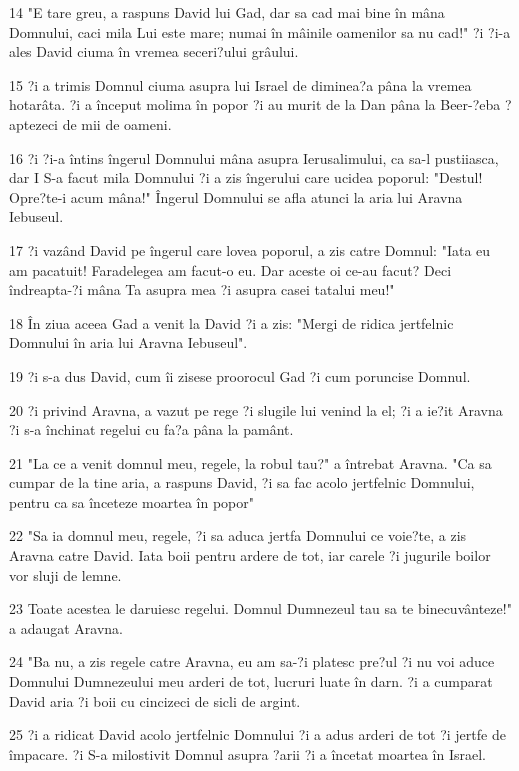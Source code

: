 \par 14 "E tare greu, a raspuns David lui Gad, dar sa cad mai bine în mâna Domnului, caci mila Lui este mare; numai în mâinile oamenilor sa nu cad!" ?i ?i-a ales David ciuma în vremea seceri?ului grâului.
\par 15 ?i a trimis Domnul ciuma asupra lui Israel de diminea?a pâna la vremea hotarâta. ?i a început molima în popor ?i au murit de la Dan pâna la Beer-?eba ?aptezeci de mii de oameni.
\par 16 ?i ?i-a întins îngerul Domnului mâna asupra Ierusalimului, ca sa-l pustiiasca, dar I S-a facut mila Domnului ?i a zis îngerului care ucidea poporul: "Destul! Opre?te-i acum mâna!" Îngerul Domnului se afla atunci la aria lui Aravna Iebuseul.
\par 17 ?i vazând David pe îngerul care lovea poporul, a zis catre Domnul: "Iata eu am pacatuit! Faradelegea am facut-o eu. Dar aceste oi ce-au facut? Deci îndreapta-?i mâna Ta asupra mea ?i asupra casei tatalui meu!"
\par 18 În ziua aceea Gad a venit la David ?i a zis: "Mergi de ridica jertfelnic Domnului în aria lui Aravna Iebuseul".
\par 19 ?i s-a dus David, cum îi zisese proorocul Gad ?i cum poruncise Domnul.
\par 20 ?i privind Aravna, a vazut pe rege ?i slugile lui venind la el; ?i a ie?it Aravna ?i s-a închinat regelui cu fa?a pâna la pamânt.
\par 21 "La ce a venit domnul meu, regele, la robul tau?" a întrebat Aravna. "Ca sa cumpar de la tine aria, a raspuns David, ?i sa fac acolo jertfelnic Domnului, pentru ca sa înceteze moartea în popor"
\par 22 "Sa ia domnul meu, regele, ?i sa aduca jertfa Domnului ce voie?te, a zis Aravna catre David. Iata boii pentru ardere de tot, iar carele ?i jugurile boilor vor sluji de lemne.
\par 23 Toate acestea le daruiesc regelui. Domnul Dumnezeul tau sa te binecuvânteze!" a adaugat Aravna.
\par 24 "Ba nu, a zis regele catre Aravna, eu am sa-?i platesc pre?ul ?i nu voi aduce Domnului Dumnezeului meu arderi de tot, lucruri luate în darn. ?i a cumparat David aria ?i boii cu cincizeci de sicli de argint.
\par 25 ?i a ridicat David acolo jertfelnic Domnului ?i a adus arderi de tot ?i jertfe de împacare. ?i S-a milostivit Domnul asupra ?arii ?i a încetat moartea în Israel.


